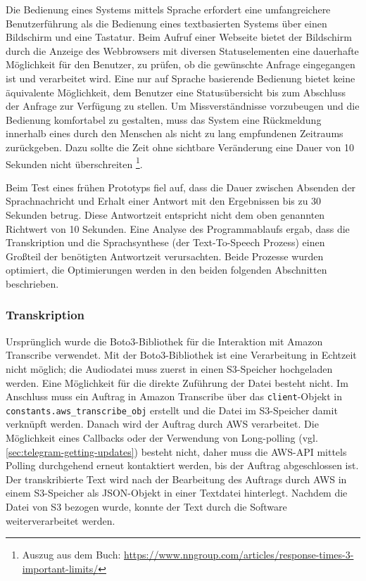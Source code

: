 Die Bedienung eines Systems mittels Sprache erfordert eine umfangreichere Benutzerführung als die Bedienung eines textbasierten Systems über einen Bildschirm und eine Tastatur. Beim Aufruf einer Webseite bietet der Bildschirm durch die Anzeige des Webbrowsers mit diversen Statuselementen eine dauerhafte Möglichkeit für den Benutzer, zu prüfen, ob die gewünschte Anfrage eingegangen ist und verarbeitet wird. Eine nur auf Sprache basierende Bedienung bietet keine äquivalente Möglichkeit, dem Benutzer eine Statusübersicht bis zum Abschluss der Anfrage zur Verfügung zu stellen. Um Missverständnisse vorzubeugen und die Bedienung komfortabel zu gestalten, muss das System eine Rückmeldung innerhalb eines durch den Menschen als nicht zu lang empfundenen Zeitraums zurückgeben. Dazu sollte die Zeit ohne sichtbare Veränderung eine Dauer von 10 Sekunden nicht überschreiten \cite[Kapitel 5.5]{response-time}\footnote{Auszug aus dem Buch: \url{https://www.nngroup.com/articles/response-times-3-important-limits/}}. 

Beim Test eines frühen Prototyps fiel auf, dass die Dauer zwischen Absenden der Sprachnachricht und Erhalt einer Antwort mit den Ergebnissen bis zu 30 Sekunden betrug. Diese Antwortzeit entspricht nicht dem oben genannten Richtwert von 10 Sekunden. Eine Analyse des Programmablaufs ergab, dass die Transkription und die Sprachsynthese (der Text-To-Speech Prozess) einen Großteil der benötigten Antwortzeit verursachten. Beide Prozesse wurden optimiert, die Optimierungen werden in den beiden folgenden Abschnitten beschrieben.

\subsubsection{Transkription}
\label{sec:optimierung-transk}

Ursprünglich wurde die Boto3-Bibliothek für die Interaktion mit Amazon Transcribe verwendet. Mit der Boto3-Bibliothek ist eine Verarbeitung in Echtzeit nicht möglich; die Audiodatei muss zuerst in einen S3-Speicher hochgeladen werden. Eine Möglichkeit für die direkte Zuführung der Datei besteht nicht. Im Anschluss muss ein Auftrag in Amazon Transcribe über das \lstinline{client}-Objekt in \lstinline{constants.aws_transcribe_obj} erstellt und die Datei im S3-Speicher damit verknüpft werden. Danach wird der Auftrag durch AWS verarbeitet. Die Möglichkeit eines Callbacks oder der Verwendung von Long-polling (vgl. \autoref{sec:telegram-getting-updates}) besteht nicht, daher muss die AWS-API mittels Polling durchgehend erneut kontaktiert werden, bis der Auftrag abgeschlossen ist. Der transkribierte Text wird nach der Bearbeitung des Auftrags durch AWS in einem S3-Speicher als JSON-Objekt in einer Textdatei hinterlegt. Nachdem die Datei von S3 bezogen wurde, konnte der Text durch die Software weiterverarbeitet werden.

